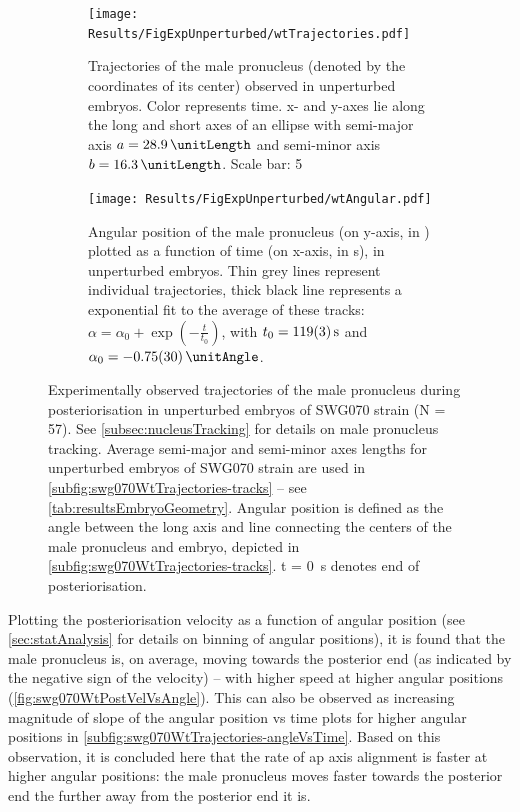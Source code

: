 \begin{figure}
\centering
\begin{subfigure}[t]{0.4\textwidth}
    \centering
    \texttt{[image: Results/FigExpUnperturbed/wtTrajectories.pdf]}
    \caption{Trajectories of the male pronucleus (denoted by the coordinates of its center) observed in unperturbed embryos. Color represents time. x- and y-axes lie along the long and short axes of an ellipse with semi-major axis $a = \SI{28.9}{\unitLength}$ and semi-minor axis $b = \SI{16.3}{\unitLength}$. Scale bar: \SI{5}{\unitLength}} 
    \label{subfig:swg070WtTrajectories-tracks}
\end{subfigure}
\hfill
\begin{subfigure}[t]{0.57\textwidth}
    \centering
    \texttt{[image: Results/FigExpUnperturbed/wtAngular.pdf]}
    \caption{Angular position of the male pronucleus (on y-axis, in \si{\unitAngle}) plotted as a function of time (on x-axis, in \si{\second}), in unperturbed embryos. Thin grey lines represent individual trajectories, thick black line represents a exponential fit to the average of these tracks: $\alpha = \alpha_0 + \exp(-\frac{t}{t_0})$, with $t_0 = \SI{119 +- 3}{\second}$ and $\alpha_0 = \SI{-0.75 +- 0.3}{\unitAngle}$.} 
    \label{subfig:swg070WtTrajectories-angleVsTime}
\end{subfigure}
\caption[Experimentally observed trajectories of the male pronucleus in unperturbed embryos]{Experimentally observed trajectories of the male pronucleus during posteriorisation in unperturbed embryos of SWG070 strain (N = 57). See \autoref{subsec:nucleusTracking} for details on male pronucleus tracking. Average semi-major and semi-minor axes lengths for unperturbed embryos of SWG070 strain are used in \autoref{subfig:swg070WtTrajectories-tracks} -- see \autoref{tab:resultsEmbryoGeometry}. Angular position is defined as the angle between the long axis and line connecting the centers of the male pronucleus and embryo, depicted in \autoref{subfig:swg070WtTrajectories-tracks}. t = \SI{0}{\second} denotes end of posteriorisation.}
\label{fig:swg070WtTrajectories}
\end{figure}

Plotting the posteriorisation velocity as a function of angular position (see \autoref{sec:statAnalysis} for details on binning of angular positions), it is found that the male pronucleus is, on average, moving towards the posterior end (as indicated by the negative sign of the velocity) -- with higher speed at higher angular positions (\autoref{fig:swg070WtPostVelVsAngle}). This can also be observed as increasing magnitude of slope of the angular position vs time plots for higher angular positions in \autoref{subfig:swg070WtTrajectories-angleVsTime}. Based on this observation, it is concluded here that the rate of \ac{ap} axis alignment is faster at higher angular positions: the male pronucleus moves faster towards the posterior end the further away from the posterior end it is.

